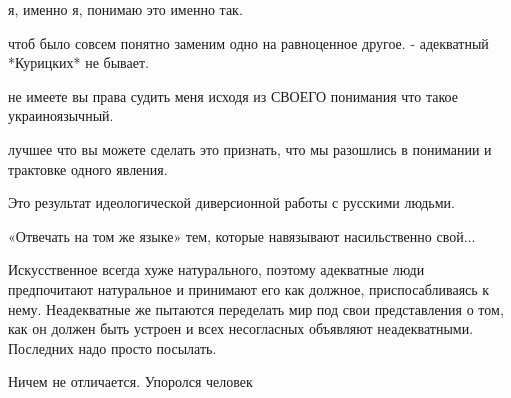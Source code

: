 \begin{itemize}
я, именно я, понимаю это именно так.

чтоб было совсем понятно заменим одно на равноценное другое. - адекватный
*Курицких* не бывает.

не имеете вы права судить меня исходя из СВОЕГО понимания что такое
украиноязычный.

лучшее что вы можете сделать это признать, что мы разошлись в понимании и
трактовке одного явления.


 
Это результат идеологической диверсионной работы с русскими людьми.

 
«Отвечать на том же языке» тем, которые навязывают насильственно свой...

 

Искусственное всегда хуже натурального, поэтому адекватные люди предпочитают
натуральное и принимают его как должное, приспосабливаясь к нему. Неадекватные
же пытаются переделать мир под свои представления о том, как он должен быть
устроен и всех несогласных объявляют неадекватными. Последних надо просто
посылать.


 
Ничем не отличается. Упоролся человек

 


\end{itemize}
